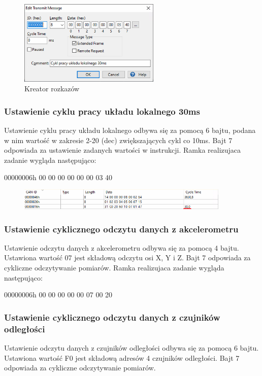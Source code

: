 \documentclass[margin = 2cm]{article}
\begin{document}
	\begin{figure}[H]
		\centering
		\includegraphics[width=0.6\textwidth]{edytorinstrukcji}
		\caption{Kreator rozkazów}
	\end{figure}
	\subsubsection{Ustawienie cyklu pracy układu lokalnego 30ms}
	\label{a}
	Ustawienie cyklu pracy układu lokalnego odbywa się za pomocą 6 bajtu, podana w nim wartość w zakresie 2-20 (dec) zwiększających cykl co 10ms. Bajt 7 odpowiada za ustawienie zadanych wartości w instrukcji.  Ramka realizujaca zadanie wygląda następująco:
	
	00000006h	00 00 00 00 00 00 03 40
	
	\begin{figure}[H]
		\centering
		\includegraphics[width=0.9\textwidth]{30ms}
	\end{figure}
	
	\subsubsection{Ustawienie cyklicznego odczytu danych z akcelerometru}
	Ustawienie odczytu danych z akcelerometru odbywa się za pomocą 4 bajtu. Ustawiona wartość 07 jest składową odczytu osi X, Y i Z. Bajt 7 odpowiada za cykliczne odczytywanie pomiarów. Ramka realizujaca zadanie wygląda następująco:
	
	00000006h	00 00 00 00 00 07 00 20
	\subsubsection{Ustawienie cyklicznego odczytu danych z czujników odległości}
	Ustawienie odczytu danych z czujników odległości odbywa się za pomocą 6 bajtu. Ustawiona wartość F0 jest składową adresów 4 czujników odległości. Bajt 7 odpowiada za cykliczne odczytywanie pomiarów. 
	
\end{document}
